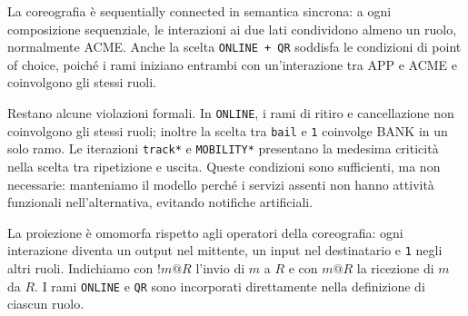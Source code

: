 \documentclass[12pt,a4paper,twoside]{report}
\newcommand{\code}[1]{\texttt{#1}}
\begin{document}
La coreografia è sequentially connected in semantica sincrona: a ogni
composizione sequenziale, le interazioni ai due lati condividono almeno un
ruolo, normalmente ACME. Anche la scelta \code{ONLINE + QR} soddisfa le
condizioni di point of choice, poiché i rami iniziano entrambi con
un'interazione tra APP e ACME e coinvolgono gli stessi ruoli.

Restano alcune violazioni formali. In \code{ONLINE}, i rami di ritiro e
cancellazione non coinvolgono gli stessi ruoli; inoltre la scelta tra
\code{bail} e \code{1} coinvolge BANK in un solo ramo. Le iterazioni
\code{track*} e \code{MOBILITY*} presentano la medesima criticità nella
scelta tra ripetizione e uscita. Queste condizioni sono sufficienti, ma non
necessarie: manteniamo il modello perché i servizi assenti non hanno attività
funzionali nell'alternativa, evitando notifiche artificiali.

La proiezione è omomorfa rispetto agli operatori della coreografia: ogni
interazione diventa un output nel mittente, un input nel destinatario e
\code{1} negli altri ruoli. Indichiamo con $!m@R$ l'invio di $m$ a $R$ e con
$m@R$ la ricezione di $m$ da $R$. I rami \code{ONLINE} e \code{QR} sono
incorporati direttamente nella definizione di ciascun ruolo.
\end{document}
